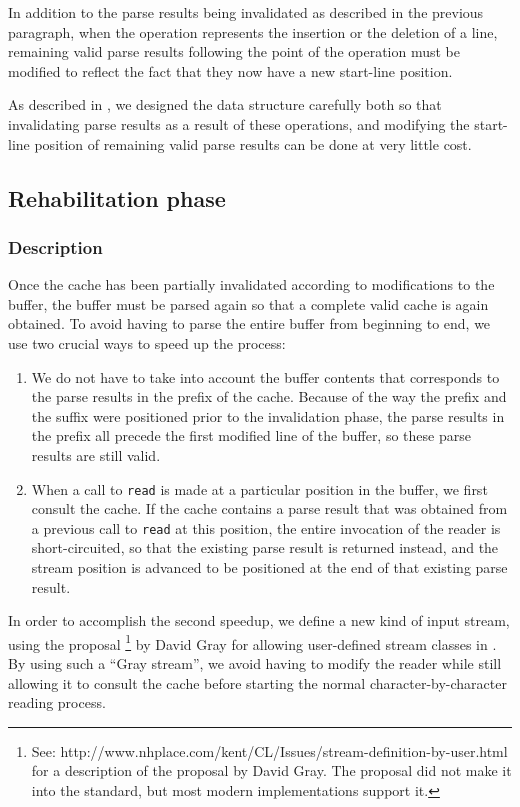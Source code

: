 In addition to the parse results being invalidated as described in the
previous paragraph, when the operation represents the insertion or the
deletion of a line, remaining valid parse results following the point
of the operation must be modified to reflect the fact that they now
have a new start-line position.

As described in , we designed the
data structure carefully both so that invalidating parse results as a
result of these operations, and modifying the start-line position of
remaining valid parse results can be done at very little cost.

\subsection{Rehabilitation phase}

\subsubsection{Description}

Once the cache has been partially invalidated according to
modifications to the buffer, the buffer must be parsed again so that a
complete valid cache is again obtained.  To avoid having to parse the
entire buffer from beginning to end, we use two crucial ways to speed
up the process:

\begin{enumerate}
\item We do not have to take into account the buffer contents that
  corresponds to the parse results in the prefix of the cache.
  Because of the way the prefix and the suffix were positioned prior
  to the invalidation phase, the parse results in the prefix all
  precede the first modified line of the buffer, so these parse
  results are still valid.
\item When a call to \texttt{read} is made at a particular position in
  the buffer, we first consult the cache.  If the cache contains a
  parse result that was obtained from a previous call to \texttt{read}
  at this position, the entire invocation of the reader is
  short-circuited, so that the existing parse result is returned
  instead, and the stream position is advanced to be positioned at the
  end of that existing parse result.
\end{enumerate}

In order to accomplish the second speedup, we define a new kind of
input stream, using the proposal%
\footnote{See:
  http://www.nhplace.com/kent/CL/Issues/stream-definition-by-user.html
  for a description of the proposal by David Gray.  The proposal did
  not make it into the \commonlisp{} standard, but most modern
  implementations support it.}
 by David Gray for allowing user-defined stream classes in
 \commonlisp{}.  By using such a ``Gray stream'', we avoid having to
 modify the reader while still allowing it to consult the cache before
 starting the normal character-by-character reading process.

